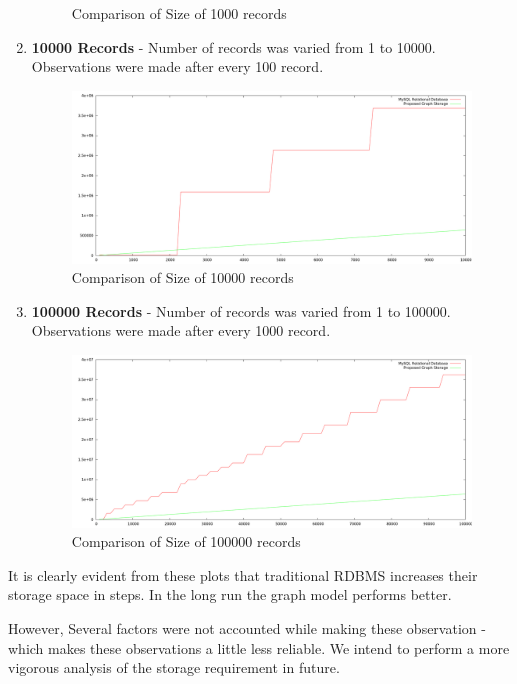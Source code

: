 \documentclass[12pt, oneside]{book}
\begin{document}
\begin{enumerate}
\begin{figure}[H]
\begin{center}
   \caption{Comparison of Size of 1000 records}
   \label{100pic}
  \end{center}
 \end{figure}
\item \textbf{10000 Records} - Number of records was varied from 1 to 10000. Observations were made after every 100 record.
 \begin{figure}[H]
  \begin{center}
   \includegraphics[width=\textwidth]{pics/10000.png}
   \caption{Comparison of Size of 10000 records}
   \label{100pic}
  \end{center}
 \end{figure}
 \item \textbf{100000 Records} - Number of records was varied from 1 to 100000. Observations were made after every 1000 record.
 \begin{figure}[H]
  \begin{center}
   \includegraphics[width=\textwidth]{pics/100000.png}
   \caption{Comparison of Size of 100000 records}
   \label{100pic}
  \end{center}
 \end{figure}
\end{enumerate}
\par
It is clearly evident from these plots that traditional RDBMS increases their storage space in steps. In the long run the graph model performs better.
\par
However, Several factors were not accounted while making these observation - which makes these observations a little less reliable. We intend to perform a more vigorous analysis of the storage requirement in future.

\pagebreak



%
%
\end{document}

